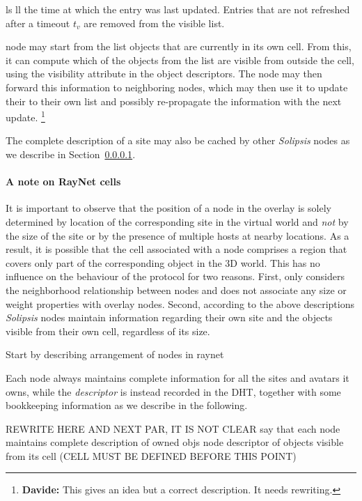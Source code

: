 \documentclass{article}
\newcommand{\df}[1]{\footnote{\textbf{Davide: }#1}}
\newcommand{\sol}{\emph{Solipsis}\xspace}
\begin{document}
ls
ll
 the time at
which the entry was last updated. Entries that are not refreshed after
a timeout $t_v$ are removed from the visible list.




node may start from the list objects that are currently in its own
cell. From this, it can compute which of the objects from the list are
visible from outside the cell, using the visibility attribute in the
object descriptors. The node may then forward this information to
neighboring nodes, which may then use it to update their to their own
list and possibly re-propagate the information with the next
update. \df{This gives an idea but a correct description. It needs
  rewriting.}


The complete description of a site may also be cached by other \sol
nodes as we describe in Section~\ref{}. 





\paragraph{A note on RayNet cells}
It is important to observe that the position of a node in the \ray
overlay is solely determined by location of the corresponding site in
the virtual world and \emph{not} by the size of the site or by the
presence of multiple hosts at nearby locations.  As a result, it is
possible that the \ray cell associated with a node comprises a region
that covers only part of the corresponding object in the 3D
world. This has no influence on the behaviour of the protocol for two
reasons. First, \ray only considers the neighborhood relationship
between nodes and does not associate any size or weight properties
with overlay nodes. Second, according to the above descriptions \sol
nodes maintain information regarding their own site and the objects
visible from their own cell, regardless of its size.


 Start by describing arrangement of nodes in raynet


Each node always maintains complete information for all
the sites and avatars it owns, while the \emph{descriptor} is instead
recorded in the DHT, together with some bookkeeping information as we
describe in the following.

REWRITE HERE AND NEXT PAR, IT IS NOT CLEAR 
say that each node maintains
complete description of owned objs
node descriptor of objects visible from its cell (CELL MUST BE DEFINED
BEFORE THIS POINT)
\end{document}
